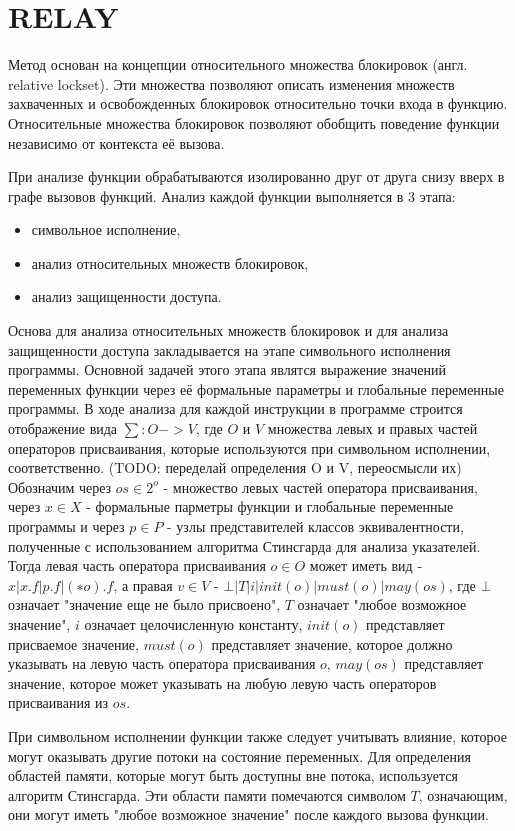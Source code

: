 \section{RELAY}

Метод основан на концепции относительного множества блокировок (англ. relative lockset). Эти множества позволяют описать изменения множеств захваченных и освобожденных блокировок относительно точки входа в функцию. Относительные множества блокировок позволяют обобщить поведение функции независимо от контекста её вызова.

При анализе функции обрабатываются изолированно друг от друга снизу вверх в графе вызовов функций. Анализ каждой функции выполняется в 3 этапа:
\begin{itemize}
\item символьное исполнение,
\item анализ относительных множеств блокировок,
\item анализ защищенности доступа.
\end{itemize}

Основа для анализа относительных множеств блокировок и для анализа защищенности доступа закладывается на этапе символьного исполнения программы. Основной задачей этого этапа являтся выражение значений переменных функции через её формальные параметры и глобальные переменные программы. В ходе анализа для каждой инструкции в программе строится отображение вида $\sum: O->V$, где $O$ и $V$ множества левых и правых частей операторов присваивания, которые используются при символьном исполнении, соответственно. (TODO: переделай определения O и V, переосмысли их) Обозначим через $os \in 2^{o}$ - множество левых частей оператора присваивания, через $x \in X$ - формальные парметры функции и глобальные переменные программы и через $p \in P$ - узлы представителей классов эквивалентности, полученные с использованием алгоритма Стинсгарда для анализа указателей. Тогда левая часть оператора присваивания $o \in O$ может иметь вид - $x | x.f | p.f | (∗o).f$, а правая $v \in V$ - $⊥ | T | i | init(o) | must(o) | may(os)$, где $⊥$ означает "значение еще не было присвоено", $T$ означает "любое возможное значение", $i$ означает целочисленную константу, $init(o)$ представляет присваемое значение, $must(o)$ представляет значение, которое должно указывать на левую часть оператора присваивания $o$, $may(os)$ представляет значение, которое может указывать на любую левую часть операторов присваивания из $os$.

При символьном исполнении функции также следует учитывать влияние, которое могут оказывать другие потоки на состояние переменных. Для определения областей памяти, которые могут быть доступны вне потока, используется алгоритм Стинсгарда. Эти области памяти помечаются символом $T$, означающим, они могут иметь "любое возможное значение" после каждого вызова функции.

